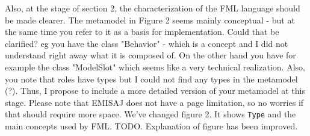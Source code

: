\documentclass[10pt]{article}
\begin{document}
\begin{response}
%
%
%
%
%
%
%
%
%

\end{response}

\begin{response}{Also, at the stage of section 2, the characterization of the FML language should be made clearer. The metamodel in Figure 2 seems mainly conceptual - but at the same time you refer to it as a basis for implementation. Could that be clarified? eg you have the class "Behavior" - which is a concept and I did not understand right away what it is composed of. On the other hand you have for example the class "ModelSlot" which seems like a very technical realization. Also, you note that roles have types but I could not find any types in the metamodel (?). Thus, I propose to include a more detailed version of your metamodel at this stage. Please note that EMISAJ does not have a page limitation, so no worries if that should require more space.} 
We've changed figure 2. It shows \texttt{Type} and the main concepts used by FML. TODO. Explanation of figure has been improved. 
\end{response}
\end{document}
